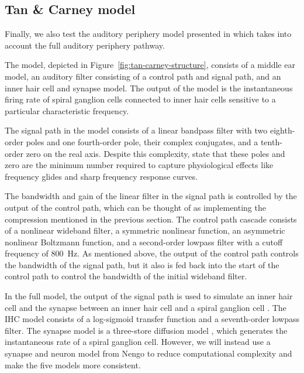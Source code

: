 \subsection{Tan \& Carney model}

Finally, we also test
the auditory periphery model
presented in \citet{tan2003}
which takes into account
the full auditory periphery pathway.


The model, depicted in
Figure~\ref{fig:tan-carney-structure},
consists of a middle ear model,
an auditory filter consisting
of a control path and signal path,
and an inner hair cell
and synapse model.
The output of the model
is the instantaneous firing rate
of spiral ganglion cells
connected to inner hair cells
sensitive to a particular
characteristic frequency.

The signal path in the model
consists of a linear bandpass filter
with two eighth-order poles
and one fourth-order pole,
their complex conjugates,
and a tenth-order zero
on the real axis.
Despite this complexity,
\citeauthor{tan2003}
state that these poles and zero
are the minimum number required
to capture physiological effects
like frequency glides
and sharp frequency response curves.

The bandwidth and gain of the linear filter
in the signal path is controlled
by the output of the control path,
which can be thought of as
implementing the compression
mentioned in the previous section.
The control path cascade consists of
a nonlinear wideband filter,
a symmetric nonlinear function,
an asymmetric nonlinear Boltzmann function,
and a second-order lowpass filter
with a cutoff frequency of 800~Hz.
As mentioned above,
the output of the control path
controls the bandwidth
of the signal path,
but it also is fed back
into the start of the control path
to control the bandwidth of the initial
wideband filter.

In the full model, the output of the signal path
is used to simulate an inner hair cell
and the synapse between an inner hair cell
and a spiral ganglion cell
\citep{zhang2001}.
The IHC model
consists of a log-sigmoid transfer function
and a seventh-order lowpass filter.
The synapse model is a three-store
diffusion model \citep{carney1993},
which generates the instantaneous
rate of a spiral ganglion cell.
However,
we will instead use a synapse
and neuron model from Nengo
to reduce computational complexity
and make the five models more consistent.

